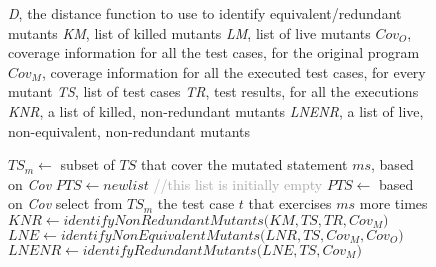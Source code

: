 
\renewcommand{\INDA}{5}
\renewcommand{\INDB}{10}
\renewcommand{\INDC}{15}
\newcommand{\INDD}{20}
\newcommand{\INDE}{25}

\renewcommand{\Comment}[1]{\textcolor{darkgray}{\textit{//#1}}}

\begin{figure}[tb]

\begin{algorithmic}[1]

\scriptsize
\Require \emph{D}, the distance function to use to identify equivalent/redundant mutants
\Require \emph{KM}, list of killed mutants
\Require \emph{LM}, list of live mutants
\Require $\mathit{Cov}_O$, coverage information for all the test cases, for the original program
\Require $\mathit{Cov}_M$, coverage information for all the executed test cases, for every mutant
\Require \emph{TS}, list of test cases
\Require \emph{TR}, test results, for all the executions
\Ensure \emph{KNR}, a list of killed, non-redundant  mutants
\Ensure \emph{LNENR}, a list of live, non-equivalent, non-redundant mutants

\State $\mathit{TS}_m \gets$ subset of $\mathit{TS}$ that cover the mutated statement $\mathit{ms}$, based on \emph{Cov} \label{alg:equivalent:select}
\State $\mathit{PTS} \gets \mathit{new} \mathit{list}$ \textcolor{darkgray}{//this list is initially empty}
\State $\mathit{PTS} \gets$ based on \emph{Cov} select from $\mathit{TS_m}$ the test case $t$ that exercises $\mathit{ms}$ more times \label{alg:equivalent:first}
\State $\mathit{KNR} \gets \mathit{identifyNonRedundantMutants(} \mathit{KM}, \mathit{TS}, \mathit{TR}, \mathit{Cov}_M)$ \label{alg:equivalent:KNR}
\State $\mathit{LNE} \gets \mathit{identifyNonEquivalentMutants(} \mathit{LNR}, \mathit{TS}, \mathit{Cov}_M, \mathit{Cov}_O)$ \label{alg:equivalent:LNE}
\State $\mathit{LNENR} \gets \mathit{identifyRedundantMutants(} \mathit{LNE}, \mathit{TS}, \mathit{Cov}_M)$ \label{alg:equivalent:LNENR}



\end{algorithmic}
\end{figure}
